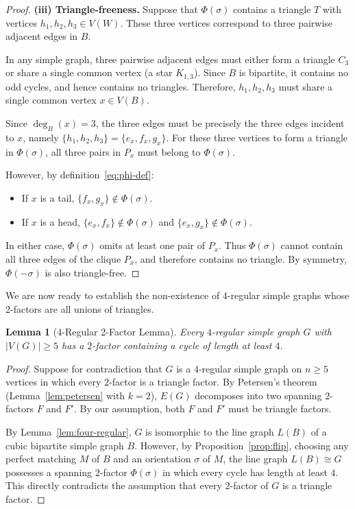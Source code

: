 \documentclass[11pt,reqno]{amsart}
\newtheorem{lemma}[theorem]{Lemma}
\theoremstyle{definition}
\theoremstyle{remark}
\begin{document}
\begin{proof}
\medskip
\noindent\textbf{(iii) Triangle-freeness.}
Suppose that $\Phi(\sigma)$ contains a triangle $T$ with vertices $h_1, h_2, h_3 \in V(W)$.
These three vertices correspond to three pairwise adjacent edges in $B$.

In any simple graph, three pairwise adjacent edges must either form a triangle $C_3$ or share a single common vertex (a star $K_{1,3}$). Since $B$ is bipartite, it contains no odd cycles, and hence contains no triangles. Therefore, $h_1, h_2, h_3$ must share a single common vertex $x \in V(B)$.

Since $\deg_B(x) = 3$, the three edges must be precisely the three edges incident to $x$, namely $\{h_1, h_2, h_3\} = \{e_x, f_x, g_x\}$. For these three vertices to form a triangle in $\Phi(\sigma)$, all three pairs in $P_x$ must belong to $\Phi(\sigma)$.

However, by definition~\eqref{eq:phi-def}:
\begin{itemize}
    \item If $x$ is a tail, $\{f_x, g_x\} \notin \Phi(\sigma)$.
    \item If $x$ is a head, $\{e_x, f_x\} \notin \Phi(\sigma)$ and $\{e_x, g_x\} \notin \Phi(\sigma)$.
\end{itemize}
In either case, $\Phi(\sigma)$ omits at least one pair of $P_x$. Thus $\Phi(\sigma)$ cannot contain all three edges of the clique $P_x$, and therefore contains no triangle. By symmetry, $\Phi(-\sigma)$ is also triangle-free.
\end{proof}

We are now ready to establish the non-existence of 4-regular simple graphs whose 2-factors are all unions of triangles.

\begin{lemma}[4-Regular 2-Factor Lemma]\label{lem:four-regular-factor}
Every $4$-regular simple graph $G$ with $|V(G)| \ge 5$ has a $2$-factor containing a cycle of length at least $4$.
\end{lemma}

\begin{proof}
Suppose for contradiction that $G$ is a $4$-regular simple graph on $n \ge 5$ vertices in which every $2$-factor is a triangle factor. By Petersen's theorem (Lemma~\ref{lem:petersen} with $k = 2$), $E(G)$ decomposes into two spanning $2$-factors $F$ and $F'$. By our assumption, both $F$ and $F'$ must be triangle factors.

By Lemma~\ref{lem:four-regular}, $G$ is isomorphic to the line graph $L(B)$ of a cubic bipartite simple graph $B$. However, by Proposition~\ref{prop:flip}, choosing any perfect matching $M$ of $B$ and an orientation $\sigma$ of $M$, the line graph $L(B) \cong G$ possesses a spanning $2$-factor $\Phi(\sigma)$ in which every cycle has length at least $4$. This directly contradicts the assumption that every $2$-factor of $G$ is a triangle factor.
\end{proof}
\end{document}
